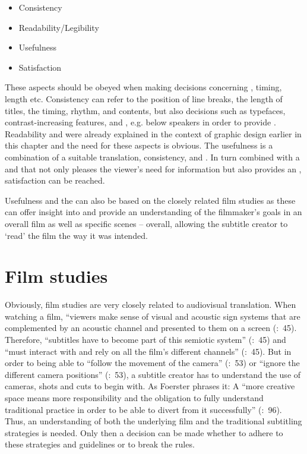 \begin{itemize}
\item Consistency
\item Readability/Legibility
\item Usefulness
\item Satisfaction
\end{itemize}

These aspects should be obeyed when making decisions concerning , timing, length etc. Consistency can refer to the position of line breaks, the length of titles, the timing, rhythm, and contents, but also  decisions such as typefaces, contrast-increasing features, and , e.g. below speakers in order to provide . Readability and  were already explained in the context of graphic design earlier in this chapter and the need for these aspects is obvious. The usefulness is a combination of a suitable translation, consistency,  and . In turn combined with a  and  that not only pleases the viewer’s need for information but also provides an , satisfaction can be reached.

Usefulness and the  can also be based on the closely related film studies as these can offer insight into  and provide an understanding of the filmmaker’s goals in an overall film as well as specific scenes – overall, allowing the subtitle creator to ‘read’ the film the way it was intended.

\section{Film studies}\label{sec:3.3}

Obviously, film studies are very closely related to audiovisual translation. When watching a film, “viewers make sense of visual and acoustic sign systems that are complemented by an acoustic channel and presented to them on a screen (\citealt{Diaz_cintas2007}:~45). Therefore, “subtitles have to become part of this semiotic system” (\citeyear{Diaz_cintas2007}:~45) and “must interact with and rely on all the film’s different channels” (\citeyear{Diaz_cintas2007}:~45). But in order to being able to “follow the movement of the camera” (\citealt{Diaz_cintas2007}:~53) or “ignore the different camera positions” (\citeyear{Diaz_cintas2007}:~53), a subtitle creator has to understand the use of cameras, shots and cuts to begin with. As Foerster phrases it: A “more creative space means more responsibility and the obligation to fully understand traditional practice in order to be able to divert from it successfully” (\citeyear{Foerster2010}:~96). Thus, an understanding of both the underlying film and the traditional subtitling strategies is needed. Only then a decision can be made whether to adhere to these strategies and guidelines or to break the rules.

